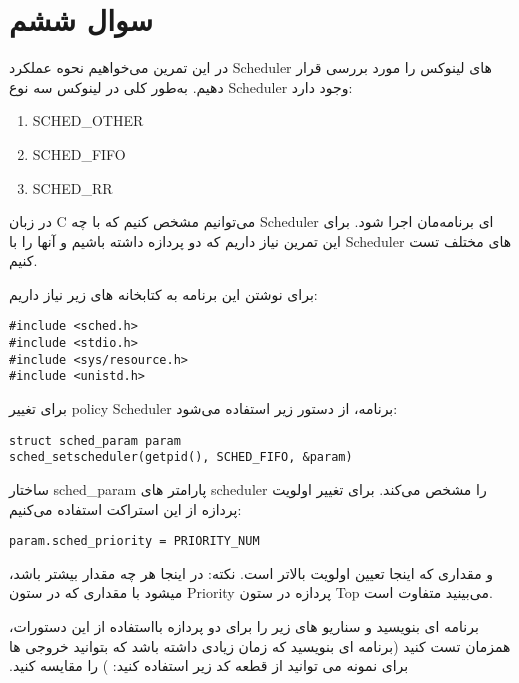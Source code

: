 \section{سوال ششم}

در این تمرین می‌خواهیم نحوه عملکرد Scheduler های لینوکس را مورد بررسی قرار دهیم. به‌طور کلی در لینوکس سه نوع Scheduler وجود دارد:
\begin{latin}
	\begin{enumerate}
		\item SCHED\_OTHER
		\item SCHED\_FIFO
		\item SCHED\_RR
	\end{enumerate}
\end{latin}

در زبان C می‌توانیم مشخص کنیم که با چه Scheduler ای برنامه‌مان اجرا شود. برای این تمرین نیاز داریم که دو پردازه داشته باشیم و آنها را با Scheduler های مختلف تست کنیم.

برای نوشتن این برنامه به کتابخانه های زیر نیاز داریم:
\begin{latin}
	\texttt{\#include <sched.h>}\\
	\texttt{\#include <stdio.h>}\\
	\texttt{\#include <sys/resource.h>}\\
	\texttt{\#include <unistd.h>}\\
\end{latin}

برای تغییر policy Scheduler برنامه، از دستور زیر استفاده می‌شود:
\begin{latin}
	\texttt{struct sched\_param param}\\
	\texttt{sched\_setscheduler(getpid(), SCHED\_FIFO, \&param)} \\
\end{latin}

ساختار sched\_param پارامتر های scheduler را مشخص می‌کند. برای تغییر اولویت پردازه از این استراکت استفاده می‌کنیم:
\begin{latin}
	\texttt{param.sched\_priority = PRIORITY\_NUM}\\
\end{latin}

نکته: ‫در‬ ‫اینجا‬ ‫هر‬ ‫چه‬ ‫مقدار‬ ‫بیشتر‬ ‫باشد‪،‬‬ ‫اولویت‬ ‫بالاتر‬ ‫است‪.‬‬ ‫و‬ ‫مقداری‬ ‫که‬ ‫اینجا‬ ‫تعیین‬ ‫میشود‬ ‫با‬ ‫مقداری‬ ‫که‬ ‫در‬ ستون Priority پردازه در ستون Top می‌بینید متفاوت است.

‫با‬‫استفاده‬ ‫از‬ ‫این‬ ‫دستورات‪،‬‬ ‫برنامه‬ ‫ای‬ ‫بنویسید‬ ‫و‬ ‫سناریو‬ ‫های‬ ‫زیر‬ ‫را‬ ‫برای‬ ‫دو‬ ‫پردازه‬ ‫همزمان‬ ‫تست‬ ‫کنید‬ ‫(برنامه‬ ‫ای‬ ‫بنویسید‬‫ که‬ ‫زمان‬ ‫زیادی‬ ‫داشته‬ ‫باشد‬ ‫که‬ ‫بتوانید‬ ‫خروجی‬ ‫ها‬ ‫را‬ ‫مقایسه‬ ‫کنید‪.‬‬ ‫برای‬ ‫نمونه‬ ‫می‬ ‫توانید‬ ‫از‬ ‫قطعه‬ ‫کد زیر استفاده کنید: )

